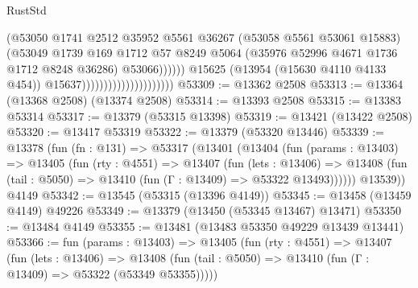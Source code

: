 \begin{lexlean}{RustStd}
\begin{coremodule}
                                                      (@53050
                                                        @1741
                                                        @2512
                                                        @35952
                                                        @5561
                                                        @36267
                                                        (@53058 @5561 @53061 @15883)
                                                        (@53049
                                                          @1739
                                                          @169
                                                          @1712
                                                          @57
                                                          @8249
                                                          @5064
                                                          (@35976
                                                            @52996
                                                            @4671
                                                            @1736
                                                            @1712
                                                            @8248
                                                            @36286)
                                                          @53066))))))
                                              @15625
                                              (@13954 (@15630 @4110 @4133 @454))
                                              @15637)))))))))))))))))))))
@53309 := @13362 @2508
@53313 := @13364 (@13368 @2508) (@13374 @2508)
@53314 := @13393 @2508
@53315 := @13383 @53314
@53317 := @13379 (@53315 @13398)
@53319 := @13421 (@13422 @2508)
@53320 := @13417 @53319
@53322 := @13379 (@53320 @13446)
@53339 := @13378
    (fun (fn : @131) =>
    @53317
      (@13401
        (@13404
          (fun (params : @13403) =>
          @13405
            (fun (rty : @4551) =>
            @13407
              (fun (lets : @13406) =>
              @13408 (fun (tail : @5050) => @13410 (fun (Γ : @13409) => @53322 @13493))))))
        @13539))
    @4149
@53342 := @13545 (@53315 (@13396 @4149))
@53345 := @13458 (@13459 @4149) @49226
@53349 := @13379 (@13450 (@53345 @13467) @13471)
@53350 := @13484 @4149
@53355 := @13481 (@13483 @53350 @49229 @13439 @13441)
@53366 := fun (params : @13403) =>
  @13405
    (fun (rty : @4551) =>
    @13407
      (fun (lets : @13406) =>
      @13408 (fun (tail : @5050) => @13410 (fun (Γ : @13409) => @53322 (@53349 @53355)))))

\end{coremodule}
\end{lexlean}
